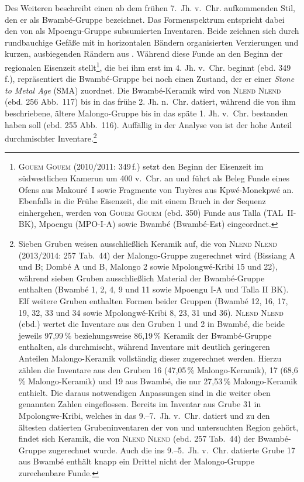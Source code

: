 Des Weiteren beschreibt \textcite[254--257]{NlendNlend.20132014} einen ab dem frühen 7.~Jh. v.~Chr. aufkommenden Stil, den er als Bwambé-Gruppe bezeichnet. Das Formenspektrum entspricht dabei den von \textcite[352--358, 354 Abb.~17.6]{GouemGouem.20102011} als Mpoengu-Gruppe subsumierten Inventaren. Beide zeichnen sich durch rundbauchige Gefäße mit in horizontalen Bändern organisierten Verzierungen und kurzen, ausbiegenden Rändern aus \parencite[ebd. 352--358, 354 Abb.~17.6; ][252 Abb.~114; Abb.~\ref{fig:swCameroon_Sequence}.8--9]{NlendNlend.20132014}. Während \textcite{GouemGouem.20102011} diese Funde an den Beginn der regionalen Eisenzeit stellt\footnote{\textsc{Gouem Gouem} (2010/2011: 349\,f.) setzt den Beginn der Eisenzeit im südwestlichen Kamerun um 400 v.~Chr. an und führt als Beleg Funde eines Ofens aus Makouré~I sowie Fragmente von Tuyères aus Kpwé-Monekpwé an. Ebenfalls in die Frühe Eisenzeit, die mit einem Bruch in der Sequenz einhergehen, werden von \textsc{Gouem Gouem} (ebd. 350) Funde aus Talla (TAL~II-BK), Mpoengu (MPO-I-A) sowie Bwambé (Bwambé-Est) eingeordnet.}, die bei ihm erst im 4. Jh. v.~Chr. beginnt (ebd. 349\,f.), repräsentiert die Bwambé-Gruppe bei \textcite{NlendNlend.20132014} noch einen Zustand, der er einer \textit{Stone to Metal Age} (SMA) zuordnet. Die Bwambé-Keramik wird von \textsc{Nlend Nlend} (ebd. 256 Abb.~117) bis in das frühe 2. Jh. n.~Chr. datiert, während die von ihm beschriebene, ältere Malongo-Gruppe bis in das späte 1. Jh. v.~Chr. bestanden haben soll (ebd. 255 Abb.~116). Auffällig in der Analyse von \textcite{NlendNlend.20132014} ist der hohe Anteil durchmischter Inventare.\footnote{Sieben Gruben weisen ausschließlich Keramik auf, die von \textsc{Nlend Nlend} (2013/2014: 257 Tab.~44) der Malongo-Gruppe zugerechnet wird (Bissiang A und B; Dombé A und B, Malongo 2 sowie Mpolongwé-Kribi 15 und 22), während sieben Gruben ausschließlich Material der Bwambé-Gruppe enthalten (Bwambé 1, 2, 4, 9 und 11 sowie Mpoengu I-A und Talla II BK). Elf weitere Gruben enthalten Formen beider Gruppen (Bwambé 12, 16, 17, 19, 32, 33 und 34 sowie Mpolongwé-Kribi 8, 23, 31 und 36). \textsc{Nlend Nlend} (ebd.) wertet die Inventare aus den Gruben 1 und 2 in Bwambé, die beide jeweils 97,99\,\% beziehungsweise 86,19\,\% Keramik der Bwambé-Gruppe enthalten, als durchmischt, während Inventare mit deutlich geringeren Anteilen Malongo-Keramik vollständig dieser zugerechnet werden. Hierzu zählen die Inventare aus den Gruben 16 (47,05\,\% Malongo-Keramik), 17 (68,6\,\% Malongo-Keramik) und 19 aus Bwambé, die nur 27,53\,\% Malongo-Keramik enthielt. Die daraus notwendigen Anpassungen sind in die weiter oben genannten Zahlen eingeflossen. Bereits im Inventar aus Grube 31 in Mpolongwe-Kribi, welches in das 9.--7.~Jh. v.~Chr. datiert und zu den ältesten datierten Grubeninventaren der von \textcite{GouemGouem.20102011} und \textcite{NlendNlend.20132014} untersuchten Region gehört, findet sich Keramik, die von \textsc{Nlend Nlend} (ebd. 257 Tab.~44) der Bwambé-Gruppe zugerechnet wurde. Auch die ins 9.--5.~Jh. v.~Chr. datierte Grube 17 aus Bwambé enthält knapp ein Drittel nicht der Malongo-Gruppe zurechenbare Funde.}

